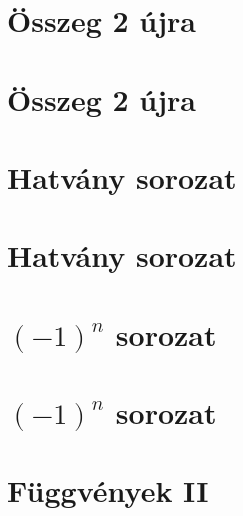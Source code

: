 \begin{spacing}{1.2}
\section*{Összeg 2 újra} \label{DBmatlabia12}
\Fa{

}
\vspace{0.5cm}
\newpage
\section*{Összeg 2 újra} \label{DBmatlabia12Mo}
\Mo{

}
\vspace{0.5cm}
\newpage
\section*{Hatvány sorozat} \label{DBmatlabia13}
\Fa{

}
\vspace{0.5cm}
\newpage
\section*{Hatvány sorozat} \label{DBmatlabia13Mo}
\Mo{

}
\vspace{0.5cm}
\newpage
\section*{$(-1)^n$ sorozat} \label{DBmatlabia14}
\Fa{

}
\vspace{0.5cm}
\newpage
\section*{$(-1)^n$ sorozat} \label{DBmatlabia14Mo}
\Mo{

}
\vspace{0.5cm}
\newpage
\section*{Függvények II} \label{DBmatlabia15}
\Desc{

}
\vspace{0.5cm}
\newpage

\end{spacing}


